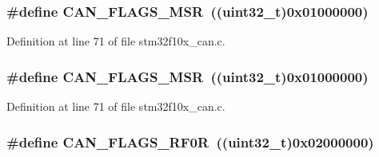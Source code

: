 \subsubsection[{\texorpdfstring{C\+A\+N\+\_\+\+F\+L\+A\+G\+S\+\_\+\+M\+SR}{CAN_FLAGS_MSR}}]{\setlength{\rightskip}{0pt plus 5cm}\#define C\+A\+N\+\_\+\+F\+L\+A\+G\+S\+\_\+\+M\+SR~(({\bf uint32\+\_\+t})0x01000000)}\hypertarget{group___c_a_n___private___defines_ga3aaa7df395ce1a90cb6e2ff3d2c4b24e}{}\label{group___c_a_n___private___defines_ga3aaa7df395ce1a90cb6e2ff3d2c4b24e}


Definition at line 71 of file stm32f10x\+\_\+can.\+c.

\subsubsection[{\texorpdfstring{C\+A\+N\+\_\+\+F\+L\+A\+G\+S\+\_\+\+M\+SR}{CAN_FLAGS_MSR}}]{\setlength{\rightskip}{0pt plus 5cm}\#define C\+A\+N\+\_\+\+F\+L\+A\+G\+S\+\_\+\+M\+SR~(({\bf uint32\+\_\+t})0x01000000)}\hypertarget{group___c_a_n___private___defines_ga3aaa7df395ce1a90cb6e2ff3d2c4b24e}{}\label{group___c_a_n___private___defines_ga3aaa7df395ce1a90cb6e2ff3d2c4b24e}


Definition at line 71 of file stm32f10x\+\_\+can.\+c.

\subsubsection[{\texorpdfstring{C\+A\+N\+\_\+\+F\+L\+A\+G\+S\+\_\+\+R\+F0R}{CAN_FLAGS_RF0R}}]{\setlength{\rightskip}{0pt plus 5cm}\#define C\+A\+N\+\_\+\+F\+L\+A\+G\+S\+\_\+\+R\+F0R~(({\bf uint32\+\_\+t})0x02000000)}\hypertarget{group___c_a_n___private___defines_ga4b22b2552759778ac07825240823a45f}{}\label{group___c_a_n___private___defines_ga4b22b2552759778ac07825240823a45f}


